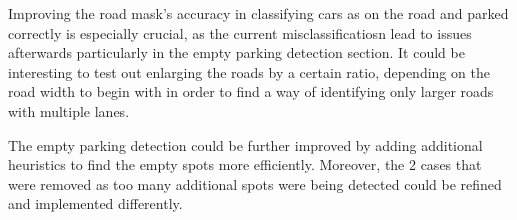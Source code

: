 Improving the road mask's accuracy in classifying cars as on the road and parked correctly is especially crucial, as the current misclassificatiosn lead to issues afterwards particularly in the empty parking detection section.
It could be interesting to test out enlarging the roads by a certain ratio, depending on the road width to begin with in order to find a way of identifying only larger roads with multiple lanes.

The empty parking detection could be further improved by adding additional heuristics to find the empty spots more efficiently. Moreover, the 2 cases that were removed as too many additional spots were being detected could be refined and implemented differently.